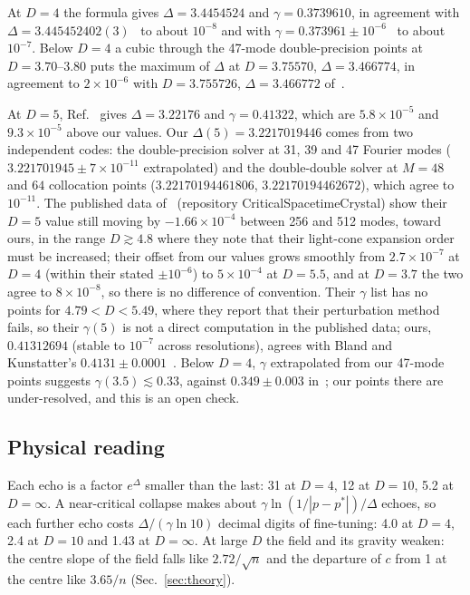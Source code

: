 \documentclass[aps,prd,onecolumn,superscriptaddress,nofootinbib,10pt]{revtex4-2}
\begin{document}
At $D = 4$ the formula gives $\Delta = 3.4454524$ and $\gamma = 0.3739610$, in agreement with
$\Delta = 3.445452402(3)$~\cite{MartinGarciaGundlach2003} to about $10^{-8}$ and with
$\gamma = 0.373961 \pm 10^{-6}$~\cite{EckerEtAl2026} to about $10^{-7}$. Below $D = 4$ a cubic through the 47-mode
double-precision points at $D = 3.70$--$3.80$ puts the maximum of $\Delta$ at $D = 3.75570$, $\Delta = 3.466774$, in
agreement to $2\times10^{-6}$ with $D = 3.755726$, $\Delta = 3.466772$ of~\cite{EckerEtAl2026}.

At $D = 5$, Ref.~\cite{EckerEtAl2026} gives $\Delta = 3.22176$ and $\gamma = 0.41322$, which are $5.8\times10^{-5}$ and
$9.3\times10^{-5}$ above our values. Our $\Delta(5) = 3.2217019446$ comes from two independent codes: the
double-precision solver at 31, 39 and 47 Fourier modes ($3.221701945 \pm 7\times10^{-11}$ extrapolated) and the
double-double solver at $M = 48$ and $64$ collocation points ($3.22170194461806$, $3.22170194462672$), which agree to
$10^{-11}$. The published data of~\cite{EckerEtAl2026} (repository CriticalSpacetimeCrystal) show their $D = 5$ value
still moving by $-1.66\times10^{-4}$ between 256 and 512 modes, toward ours, in the range $D \gtrsim 4.8$ where they
note that their light-cone expansion order must be increased; their offset from our values grows smoothly from
$2.7\times10^{-7}$ at $D = 4$ (within their stated $\pm10^{-6}$) to $5\times10^{-4}$ at $D = 5.5$, and at $D = 3.7$ the two
agree to $8\times10^{-8}$, so there is no difference of convention. Their $\gamma$ list has no points for
$4.79 < D < 5.49$, where they report that their perturbation method fails, so their $\gamma(5)$ is not a direct
computation in the published data; ours, $0.41312694$ (stable to $10^{-7}$ across resolutions), agrees with Bland and
Kunstatter's $0.4131 \pm 0.0001$~\cite{BlandKunstatter2007}. Below $D = 4$, $\gamma$
extrapolated from our 47-mode points suggests $\gamma(3.5) \lesssim 0.33$, against $0.349 \pm 0.003$
in~\cite{BlandEtAl2005}; our points there are under-resolved, and this is an open check.

\subsection{Physical reading}

Each echo is a factor $e^{\Delta}$ smaller than the last: 31 at $D = 4$, 12 at $D = 10$, 5.2 at $D = \infty$. A
near-critical collapse makes about $\gamma\ln(1/|p-p^*|)/\Delta$ echoes, so each further echo costs
$\Delta/(\gamma\ln10)$ decimal digits of fine-tuning: 4.0 at $D = 4$, 2.4 at $D = 10$ and 1.43 at $D = \infty$. At large
$D$ the field and its gravity weaken: the centre slope of the field falls like $2.72/\sqrt n$ and the departure of $c$ from
1 at the centre like $3.65/n$ (Sec.~\ref{sec:theory}).
\end{document}
